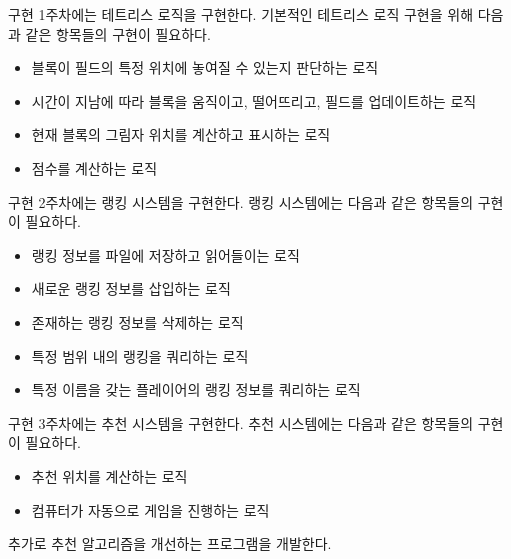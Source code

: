 구현 1주차에는 테트리스 로직을 구현한다. 기본적인 테트리스 로직 구현을 위해 다음과 같은 항목들의 구현이 필요하다.
\begin{itemize}
    \item 블록이 필드의 특정 위치에 놓여질 수 있는지 판단하는 로직
    \item 시간이 지남에 따라 블록을 움직이고, 떨어뜨리고, 필드를 업데이트하는 로직
    \item 현재 블록의 그림자 위치를 계산하고 표시하는 로직
    \item 점수를 계산하는 로직
\end{itemize}

구현 2주차에는 랭킹 시스템을 구현한다. 랭킹 시스템에는 다음과 같은 항목들의 구현이 필요하다.
\begin{itemize}
    \item 랭킹 정보를 파일에 저장하고 읽어들이는 로직
    \item 새로운 랭킹 정보를 삽입하는 로직
    \item 존재하는 랭킹 정보를 삭제하는 로직
    \item 특정 범위 내의 랭킹을 쿼리하는 로직
    \item 특정 이름을 갖는 플레이어의 랭킹 정보를 쿼리하는 로직
\end{itemize}

구현 3주차에는 추천 시스템을 구현한다. 추천 시스템에는 다음과 같은 항목들의 구현이 필요하다.
\begin{itemize}
    \item 추천 위치를 계산하는 로직
    \item 컴퓨터가 자동으로 게임을 진행하는 로직
\end{itemize}

추가로 추천 알고리즘을 개선하는 프로그램을 개발한다.